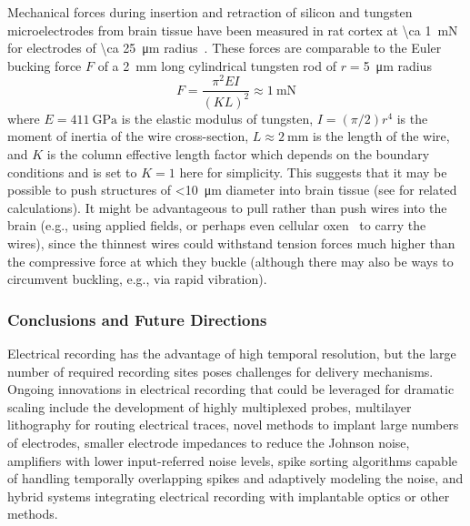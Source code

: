 Mechanical forces during insertion and retraction of silicon and tungsten microelectrodes from brain tissue have been measured in rat cortex at \SI{\ca 1}{\milli\newton} for electrodes of \SI{\ca 25}{\micro\meter} radius~\cite{jensen03}.
These forces are comparable to the Euler bucking force $F$ of a \SI{2}{\milli\meter} long cylindrical tungsten rod of $r=$\SI{5}{\micro\meter} radius
\[F=\frac{\pi^2 E I}{(K L)^2} \approx \SI{1}{\milli\newton}\]
where $E=\SI{411}{\giga\pascal}$ is the elastic modulus of tungsten, $I=(\pi/2)r^4$ is the moment of inertia of the wire cross-section, $L\approx\SI{2}{\milli\meter}$ is the length of the wire, and $K$ is the column effective length factor which depends on the boundary conditions and is set to $K=1$ here for simplicity.
This suggests that it may be possible to push structures of \SI{<10}{\micro\meter} diameter into brain tissue (see \cite{najafi90} for related calculations). It might be advantageous to pull rather than push wires into the brain (e.g., using applied fields, or perhaps even cellular oxen~\cite{Weibel23082005} to carry the wires), since the thinnest wires could withstand tension forces much higher than the compressive force at which they buckle (although there may also be ways to circumvent buckling, e.g., via rapid vibration).

\subsubsection{Conclusions and Future Directions}

Electrical recording has the advantage of high temporal resolution, but the large number of required recording sites poses challenges for delivery mechanisms.
Ongoing innovations in electrical recording that could be leveraged for dramatic scaling include the development of highly multiplexed probes, multilayer lithography for routing electrical traces, novel methods to implant large numbers of electrodes, smaller electrode impedances to reduce the Johnson noise, amplifiers with lower input-referred noise levels, spike sorting algorithms capable of handling temporally overlapping spikes and adaptively modeling the noise, and hybrid systems integrating electrical recording with implantable optics or other methods.

